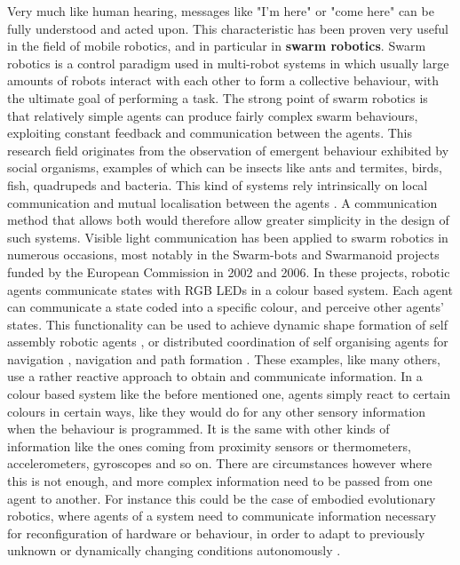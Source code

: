 Very much like human hearing, messages like "I'm here" or "come here" can be fully understood and acted upon.
\newline
This characteristic has been proven very useful in the field of mobile robotics, and in particular in \textbf{swarm robotics}.
Swarm robotics is a control paradigm used in multi-robot systems in which usually large amounts of robots interact with each other to form a collective behaviour, with the ultimate goal of performing a task.
The strong point of swarm robotics is that relatively simple agents can produce fairly complex swarm behaviours, exploiting constant feedback and communication between the agents.
This research field originates from the observation of emergent behaviour exhibited by social organisms, examples of which can be insects like ants and termites, birds, fish, quadrupeds and bacteria.
This kind of systems rely intrinsically on local communication and mutual localisation between the agents 
\cite{architecturesswarm}.
A communication method that allows both would therefore allow greater simplicity in the design of such systems.
Visible light communication has been applied to swarm robotics in numerous occasions, most notably in the Swarm-bots and Swarmanoid projects funded by the European Commission in 2002 and 2006.
In these projects, robotic agents communicate states with RGB LEDs in a colour based system.
Each agent can communicate a state coded into a specific colour, and perceive other agents' states.
This functionality can be used to achieve dynamic shape formation of self assembly robotic agents  \cite{assemblysbots}, or distributed coordination of self organising agents for navigation \cite{distrcoord} \cite{holeavoidance}, navigation and path formation \cite{pathformation}.
\newline
These examples, like many others, use a rather reactive approach to obtain and communicate information.
In a colour based system like the before mentioned one, agents simply react to certain colours in certain ways, like they would do for any other sensory information when the behaviour is programmed.
It is the same with other kinds of information like the ones coming from proximity sensors or thermometers, accelerometers, gyroscopes and so on.
There are circumstances however where this is not enough, and more complex information need to be passed from one agent to another.
For instance this could be the case of embodied evolutionary robotics, where agents of a system need to communicate information necessary for reconfiguration of hardware or behaviour, in order to adapt to previously unknown or dynamically changing conditions autonomously \cite{embodiedevolution}.
